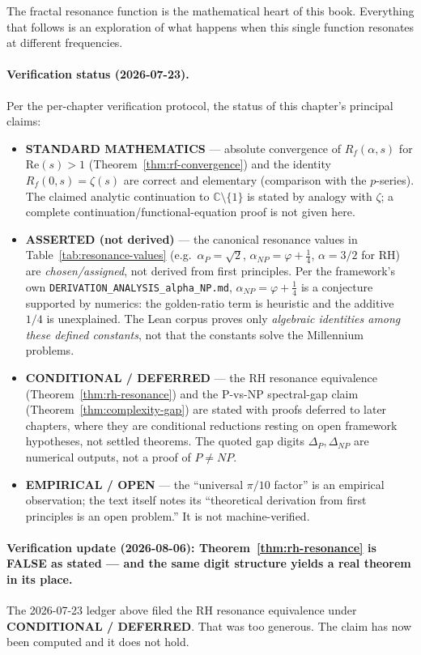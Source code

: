 The fractal resonance function is the mathematical heart of this book. Everything that follows is an exploration of what happens when this single function resonates at different frequencies.

\paragraph{Verification status (2026-07-23).}
Per the per-chapter verification protocol, the status of this chapter's principal claims:
\begin{itemize}
\item \textbf{STANDARD MATHEMATICS} --- absolute convergence of $R_f(\alpha,s)$ for $\text{Re}(s)>1$ (Theorem~\ref{thm:rf-convergence}) and the identity $R_f(0,s)=\zeta(s)$ are correct and elementary (comparison with the $p$-series). The claimed analytic continuation to $\mathbb{C}\setminus\{1\}$ is stated by analogy with $\zeta$; a complete continuation/functional-equation proof is not given here.
\item \textbf{ASSERTED (not derived)} --- the canonical resonance values in Table~\ref{tab:resonance-values} (e.g.\ $\alpha_P=\sqrt2$, $\alpha_{NP}=\varphi+\tfrac14$, $\alpha=3/2$ for RH) are \emph{chosen/assigned}, not derived from first principles. Per the framework's own \texttt{DERIVATION\_ANALYSIS\_alpha\_NP.md}, $\alpha_{NP}=\varphi+\tfrac14$ is a conjecture supported by numerics: the golden-ratio term is heuristic and the additive $1/4$ is unexplained. The Lean corpus proves only \emph{algebraic identities among these defined constants}, not that the constants solve the Millennium problems.
\item \textbf{CONDITIONAL / DEFERRED} --- the RH resonance equivalence (Theorem~\ref{thm:rh-resonance}) and the P-vs-NP spectral-gap claim (Theorem~\ref{thm:complexity-gap}) are stated with proofs deferred to later chapters, where they are conditional reductions resting on open framework hypotheses, not settled theorems. The quoted gap digits $\Delta_P,\Delta_{NP}$ are numerical outputs, not a proof of $P\neq NP$.
\item \textbf{EMPIRICAL / OPEN} --- the ``universal $\pi/10$ factor'' is an empirical observation; the text itself notes its ``theoretical derivation from first principles is an open problem.'' It is not machine-verified.
\end{itemize}

\paragraph{Verification update (2026-08-06): Theorem~\ref{thm:rh-resonance} is
FALSE as stated --- and the same digit structure yields a real theorem in its
place.}
The 2026-07-23 ledger above filed the RH resonance equivalence under
\textbf{CONDITIONAL / DEFERRED}. That was too generous. The claim has now been
computed and it does not hold.

